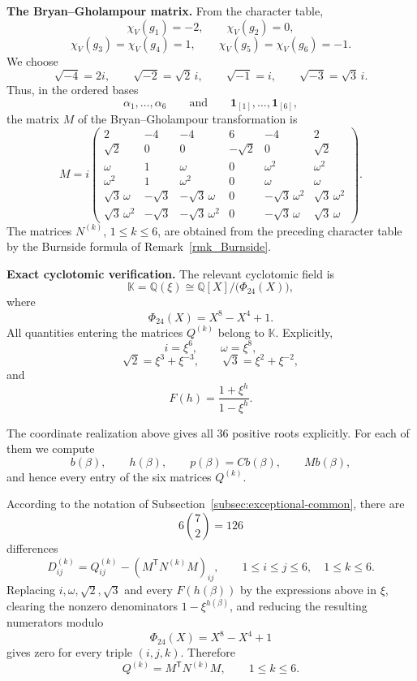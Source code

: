 \documentclass[a4paper,reqno]{amsart}
\theoremstyle{plain} %
\theoremstyle{definition} %
\theoremstyle{remark} %
\newcommand{\1}{\mathds{1}}   %
\begin{document}
\medskip

\noindent\textbf{The Bryan--Gholampour matrix.}
From the character table,
\[
\chi_V(g_1)=-2,
\qquad
\chi_V(g_2)=0,
\]
\[
\chi_V(g_3)=\chi_V(g_4)=1,
\qquad
\chi_V(g_5)=\chi_V(g_6)=-1.
\]
We choose
\[
\sqrt{-4}=2i,
\qquad
\sqrt{-2}=\sqrt2\,i,
\qquad
\sqrt{-1}=i,
\qquad
\sqrt{-3}=\sqrt3\,i.
\]
Thus, in the ordered bases
\[
\alpha_1,\ldots,\alpha_6
\qquad\text{and}\qquad
\mathbf1_{[1]},\ldots,\mathbf1_{[6]},
\]
the matrix \(M\) of the Bryan--Gholampour transformation is
\[
M
=
i
\begin{pmatrix}
2&-4&-4&6&-4&2\\
\sqrt2&0&0&-\sqrt2&0&\sqrt2\\
\omega&1&\omega&0&\omega^2&\omega^2\\
\omega^2&1&\omega^2&0&\omega&\omega\\
\sqrt3\,\omega&-\sqrt3&-\sqrt3\,\omega&0&
-\sqrt3\,\omega^2&\sqrt3\,\omega^2\\
\sqrt3\,\omega^2&-\sqrt3&-\sqrt3\,\omega^2&0&
-\sqrt3\,\omega&\sqrt3\,\omega
\end{pmatrix}.
\]
The matrices \(N^{(k)}\), \(1\le k\le6\), are obtained from the
preceding character table by the Burnside formula of Remark~\ref{rmk_Burnside}.

\medskip

\noindent\textbf{Exact cyclotomic verification.}
The relevant cyclotomic field is
\[
\mathbb K
=
\mathbb Q(\xi)
\cong
\mathbb Q[X]/\bigl(\Phi_{24}(X)\bigr),
\]
where
\[
\Phi_{24}(X)=X^8-X^4+1.
\]
All quantities entering the matrices \(Q^{(k)}\) belong to
\(\mathbb K\).  Explicitly,
\[
i=\xi^6,
\qquad
\omega=\xi^8,
\]
\[
\sqrt2=\xi^3+\xi^{-3},
\qquad
\sqrt3=\xi^2+\xi^{-2},
\]
and
\[
F(h)
=
\frac{1+\xi^h}{1-\xi^h}.
\]


The coordinate realization above gives all \(36\) positive roots
explicitly.  For each of them we compute
\[
b(\beta),
\qquad
h(\beta),
\qquad
p(\beta)=Cb(\beta),
\qquad
Mb(\beta),
\]
and hence every entry of the six matrices \(Q^{(k)}\).

According to the notation of
Subsection~\ref{subsec:exceptional-common}, there are
\[
6\binom72=126
\]
differences
\[
D_{ij}^{(k)}
=
Q_{ij}^{(k)}
-
\left(M^{\mathsf T}N^{(k)}M\right)_{ij},
\qquad
1\le i\le j\le6,
\quad
1\le k\le6.
\]
Replacing \(i,\omega,\sqrt2,\sqrt3\) and every
\(F(h(\beta))\) by the expressions above in \(\xi\), clearing the
nonzero denominators \(1-\xi^{h(\beta)}\), and reducing the resulting
numerators modulo
\[
\Phi_{24}(X)=X^8-X^4+1
\]
gives zero for every triple \((i,j,k)\).  Therefore
\[
Q^{(k)}
=
M^{\mathsf T}N^{(k)}M,
\qquad
1\le k\le6.
\]
\end{document}
